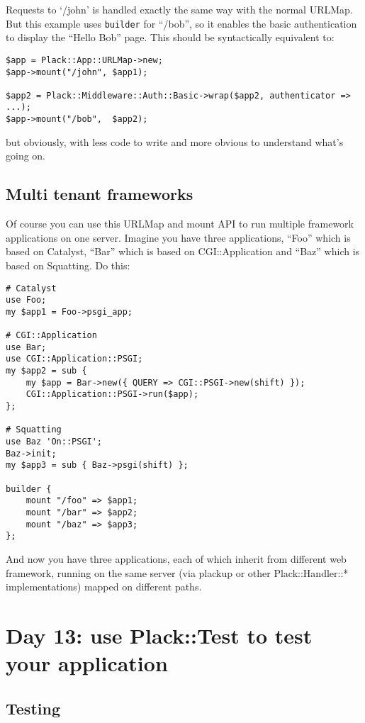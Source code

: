 Requests to `/john' is handled exactly the same way with the normal
URLMap. But this example uses \lstinline!builder! for ``/bob'', so it
enables the basic authentication to display the ``Hello Bob'' page. This
should be syntactically equivalent to:

\begin{lstlisting}
$app = Plack::App::URLMap->new;
$app->mount("/john", $app1);

$app2 = Plack::Middleware::Auth::Basic->wrap($app2, authenticator => ...);
$app->mount("/bob",  $app2);
\end{lstlisting}

but obviously, with less code to write and more obvious to understand
what's going on.

\subsection{Multi tenant frameworks}\label{multi-tenant-frameworks}

Of course you can use this URLMap and mount API to run multiple
framework applications on one server. Imagine you have three
applications, ``Foo'' which is based on Catalyst, ``Bar'' which is based
on CGI::Application and ``Baz'' which is based on Squatting. Do this:

\begin{lstlisting}
# Catalyst
use Foo;
my $app1 = Foo->psgi_app;

# CGI::Application
use Bar;
use CGI::Application::PSGI;
my $app2 = sub { 
    my $app = Bar->new({ QUERY => CGI::PSGI->new(shift) });
    CGI::Application::PSGI->run($app);
};

# Squatting
use Baz 'On::PSGI';
Baz->init;
my $app3 = sub { Baz->psgi(shift) };

builder {
    mount "/foo" => $app1;
    mount "/bar" => $app2;
    mount "/baz" => $app3;
};
\end{lstlisting}

And now you have three applications, each of which inherit from
different web framework, running on the same server (via plackup or
other Plack::Handler::* implementations) mapped on different paths.

\section{Day 13: use Plack::Test to test your
application}\label{day-13-use-placktest-to-test-your-application}

\subsection{Testing}\label{testing}

